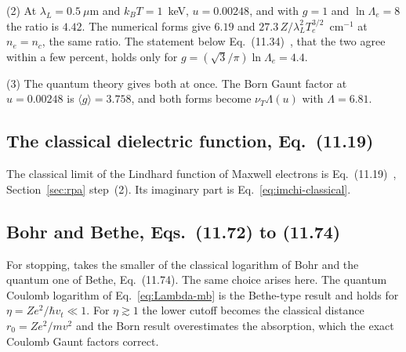 \documentclass[11pt]{article}
\numberwithin{equation}{section}
\newcommand{\nuT}{\nu_T}
\newcommand{\kB}{k_B}
\begin{document}
{\noindent}(2) At $\lambda_L=0.5~\mu$m and $\kB T=1$~keV, $u=0.00248$, and with
$g=1$ and $\ln\Lambda_e=8$ the ratio is $4.42$. The numerical forms give
$6.19$ and $27.3\,Z/\lambda_L^2T_e^{3/2}$~cm$^{-1}$ at $n_e=n_c$, the same
ratio. The statement below Eq.~(11.34)~\cite{Atzeni2004}, that the two agree
within a few percent, holds only for $g=(\sqrt3/\pi)\ln\Lambda_e=4.4$.

{\noindent}(3) The quantum theory gives both at once. The Born Gaunt factor at
$u=0.00248$ is $\langle g\rangle=3.758$, and both forms become
$\nuT\Lambda(u)$ with $\Lambda=6.81$.

\subsection{The classical dielectric function, Eq.~(11.19)}
The classical limit of the Lindhard function of Maxwell electrons is
Eq.~(11.19)~\cite{Atzeni2004}, Section~\ref{sec:rpa} step~(2). Its imaginary
part is Eq.~\eqref{eq:imchi-classical}.

\subsection{Bohr and Bethe, Eqs.~(11.72) to (11.74)}
For stopping, \cite{Atzeni2004} takes the smaller of the classical
logarithm of Bohr and the quantum one of Bethe, Eq.~(11.74). The same choice
arises here. The quantum Coulomb logarithm of
Eq.~\eqref{eq:Lambda-mb} is the Bethe-type result and holds for
$\eta=Ze^2/\hbar v_t\ll1$. For $\eta\gtrsim1$ the lower cutoff becomes the
classical distance $r_0=Ze^2/mv^2$ and the Born result overestimates the
absorption, which the exact Coulomb Gaunt factors correct.
\end{document}
